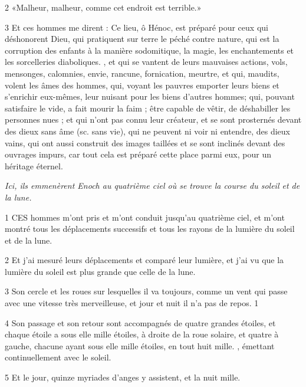 \par 2 «Malheur, malheur, comme cet endroit est terrible.»

\par 3 Et ces hommes me dirent : Ce lieu, ô Hénoc, est préparé pour ceux qui déshonorent Dieu, qui pratiquent sur terre le péché contre nature, qui est la corruption des enfants à la manière sodomitique, la magie, les enchantements et les sorcelleries diaboliques. , et qui se vantent de leurs mauvaises actions, vols, mensonges, calomnies, envie, rancune, fornication, meurtre, et qui, maudits, volent les âmes des hommes, qui, voyant les pauvres emporter leurs biens et s'enrichir eux-mêmes, leur nuisant pour les biens d'autres hommes; qui, pouvant satisfaire le vide, a fait mourir la faim ; être capable de vêtir, de déshabiller les personnes nues ; et qui n'ont pas connu leur créateur, et se sont prosternés devant des dieux sans âme (sc. sans vie), qui ne peuvent ni voir ni entendre, des dieux vains, qui ont aussi construit des images taillées et se sont inclinés devant des ouvrages impurs, car tout cela est préparé cette place parmi eux, pour un héritage éternel.


\par \textit{Ici, ils emmenèrent Enoch au quatrième ciel où se trouve la course du soleil et de la lune.}

\par 1 CES hommes m'ont pris et m'ont conduit jusqu'au quatrième ciel, et m'ont montré tous les déplacements successifs et tous les rayons de la lumière du soleil et de la lune.

\par 2 Et j'ai mesuré leurs déplacements et comparé leur lumière, et j'ai vu que la lumière du soleil est plus grande que celle de la lune.

\par 3 Son cercle et les roues sur lesquelles il va toujours, comme un vent qui passe avec une vitesse très merveilleuse, et jour et nuit il n'a pas de repos. 1

\par 4 Son passage et son retour sont accompagnés de quatre grandes étoiles, et chaque étoile a sous elle mille étoiles, à droite de la roue solaire, et quatre à gauche, chacune ayant sous elle mille étoiles, en tout huit mille. , émettant continuellement avec le soleil.

\par 5 Et le jour, quinze myriades d'anges y assistent, et la nuit mille.

